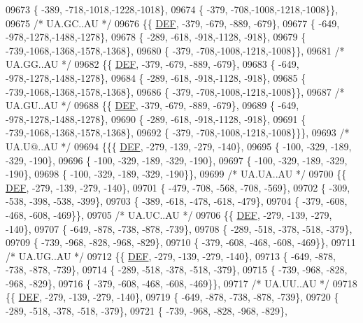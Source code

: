 \begin{DoxyCode}
09673 \{ -389, -718,-1018,-1228,-1018\},
09674 \{ -379, -708,-1008,-1218,-1008\}\},
09675 \textcolor{comment}{/* UA.GC..AU */}
09676 \{\{  \mbox{\hyperlink{1_88_84__epars_8h_a397419fc12b37ed479c8abb9d444d843}{DEF}}, -379, -679, -889, -679\},
09677 \{ -649, -978,-1278,-1488,-1278\},
09678 \{ -289, -618, -918,-1128, -918\},
09679 \{ -739,-1068,-1368,-1578,-1368\},
09680 \{ -379, -708,-1008,-1218,-1008\}\},
09681 \textcolor{comment}{/* UA.GG..AU */}
09682 \{\{  \mbox{\hyperlink{1_88_84__epars_8h_a397419fc12b37ed479c8abb9d444d843}{DEF}}, -379, -679, -889, -679\},
09683 \{ -649, -978,-1278,-1488,-1278\},
09684 \{ -289, -618, -918,-1128, -918\},
09685 \{ -739,-1068,-1368,-1578,-1368\},
09686 \{ -379, -708,-1008,-1218,-1008\}\},
09687 \textcolor{comment}{/* UA.GU..AU */}
09688 \{\{  \mbox{\hyperlink{1_88_84__epars_8h_a397419fc12b37ed479c8abb9d444d843}{DEF}}, -379, -679, -889, -679\},
09689 \{ -649, -978,-1278,-1488,-1278\},
09690 \{ -289, -618, -918,-1128, -918\},
09691 \{ -739,-1068,-1368,-1578,-1368\},
09692 \{ -379, -708,-1008,-1218,-1008\}\}\},
09693 \textcolor{comment}{/* UA.U@..AU */}
09694 \{\{\{  \mbox{\hyperlink{1_88_84__epars_8h_a397419fc12b37ed479c8abb9d444d843}{DEF}}, -279, -139, -279, -140\},
09695 \{ -100, -329, -189, -329, -190\},
09696 \{ -100, -329, -189, -329, -190\},
09697 \{ -100, -329, -189, -329, -190\},
09698 \{ -100, -329, -189, -329, -190\}\},
09699 \textcolor{comment}{/* UA.UA..AU */}
09700 \{\{  \mbox{\hyperlink{1_88_84__epars_8h_a397419fc12b37ed479c8abb9d444d843}{DEF}}, -279, -139, -279, -140\},
09701 \{ -479, -708, -568, -708, -569\},
09702 \{ -309, -538, -398, -538, -399\},
09703 \{ -389, -618, -478, -618, -479\},
09704 \{ -379, -608, -468, -608, -469\}\},
09705 \textcolor{comment}{/* UA.UC..AU */}
09706 \{\{  \mbox{\hyperlink{1_88_84__epars_8h_a397419fc12b37ed479c8abb9d444d843}{DEF}}, -279, -139, -279, -140\},
09707 \{ -649, -878, -738, -878, -739\},
09708 \{ -289, -518, -378, -518, -379\},
09709 \{ -739, -968, -828, -968, -829\},
09710 \{ -379, -608, -468, -608, -469\}\},
09711 \textcolor{comment}{/* UA.UG..AU */}
09712 \{\{  \mbox{\hyperlink{1_88_84__epars_8h_a397419fc12b37ed479c8abb9d444d843}{DEF}}, -279, -139, -279, -140\},
09713 \{ -649, -878, -738, -878, -739\},
09714 \{ -289, -518, -378, -518, -379\},
09715 \{ -739, -968, -828, -968, -829\},
09716 \{ -379, -608, -468, -608, -469\}\},
09717 \textcolor{comment}{/* UA.UU..AU */}
09718 \{\{  \mbox{\hyperlink{1_88_84__epars_8h_a397419fc12b37ed479c8abb9d444d843}{DEF}}, -279, -139, -279, -140\},
09719 \{ -649, -878, -738, -878, -739\},
09720 \{ -289, -518, -378, -518, -379\},
09721 \{ -739, -968, -828, -968, -829\},

\end{DoxyCode}

